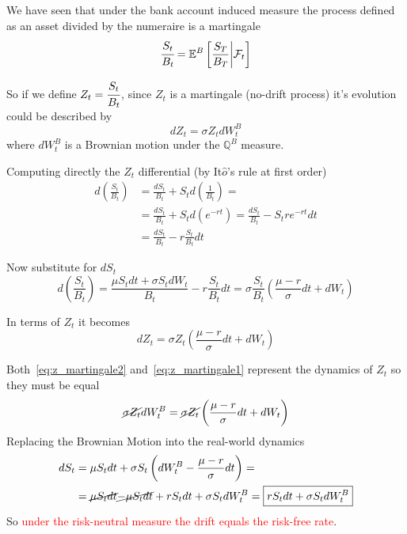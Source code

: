 \documentclass[12pt,a4paper]{book}
\begin{document}
\begin{solution}
We have seen that under the bank account induced measure the process defined as an asset divided by the numeraire is a martingale
\begin{equation*}
\cfrac{S_t}{B_t} = \mathbb{E}^{B}\left[\frac{S_T}{B_T}\bigg|\mathcal{F}_t\right]
\end{equation*}

So if we define $Z_t=\cfrac{S_t}{B_t}$, since $Z_t$ is a martingale (no-drift process) it's evolution could be described by
\begin{equation}
dZ_t = \sigma Z_t dW_t^B
\label{eq:z_martingale1}
\end{equation}
where $dW_t^B$ is a Brownian motion under the $\mathbb{Q}^B$ measure.

Computing directly the $Z_t$ differential (by It$\hat{o}$'s rule at first order)
\begin{equation*}
\begin{aligned}
d\left(\frac{S_t}{B_t}\right) &= \frac{dS_t}{B_t} + S_t d\left(\frac{1}{B_t}\right) = \\ 
&=\frac{dS_t}{B_t} + S_t d\left(e^{-rt}\right) = \frac{dS_t}{B_t} - S_t re^{-rt}dt \\
&= \frac{dS_t}{B_t} - r\frac{S_t}{B_t}dt 
\end{aligned}
\end{equation*}

Now substitute for $dS_t$
\begin{equation*}
d\left(\frac{S_t}{B_t}\right)= \frac{ \mu S_t dt + \sigma S_t dW_t}{B_t} - r\frac{S_t}{B_t}dt = \sigma\frac{S_t}{B_t}\left(\frac{\mu - r}{\sigma}dt + dW_t \right)
\end{equation*}	

In terms of $Z_t$ it becomes
\begin{equation}
dZ_t = \sigma Z_t\left(\frac{\mu - r}{\sigma}dt + dW_t \right)
\label{eq:z_martingale2}
\end{equation}

Both~\ref{eq:z_martingale2} and~\ref{eq:z_martingale1} represent the dynamics of $Z_t$ so they must be equal
\begin{equation*}
\cancel{\sigma Z_t}dW_t^B = \cancel{\sigma Z_t}\left(\frac{\mu - r}{\sigma}dt + dW_t\right)
\end{equation*}
Replacing the Brownian Motion into the real-world dynamics
\begin{equation*}
\begin{aligned}
dS_t &= \mu S_t dt + \sigma S_t \left(dW_t^B - \frac{\mu - r}{\sigma}dt\right) =\\
& = \cancel{\mu S_t dt} \cancel{-\mu S_t dt} + rS_t dt + \sigma S_t dW_t^B  = \boxed{rS_t dt + \sigma S_t dW_t^B}
\end{aligned}
\end{equation*}
So \textcolor{red}{under the risk-neutral measure the drift equals the risk-free rate}.


\end{solution}
\end{document}
